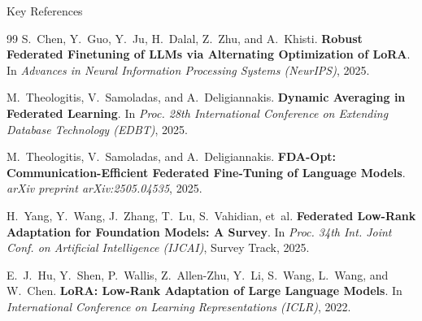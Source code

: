 \documentclass[aspectratio=169]{beamer}
\begin{document}
\begin{frame}{Key References}
    \scriptsize
    \begin{thebibliography}{99}
        S.~Chen, Y.~Guo, Y.~Ju, H.~Dalal, Z.~Zhu, and A.~Khisti.
        \newblock \textbf{Robust Federated Finetuning of LLMs via Alternating Optimization of LoRA}.
        \newblock In \emph{Advances in Neural Information Processing Systems (NeurIPS)}, 2025.
        
        M.~Theologitis, V.~Samoladas, and A.~Deligiannakis.
        \newblock \textbf{Dynamic Averaging in Federated Learning}.
        \newblock In \emph{Proc. 28th International Conference on Extending Database Technology (EDBT)}, 2025.
        
        M.~Theologitis, V.~Samoladas, and A.~Deligiannakis.
        \newblock \textbf{FDA-Opt: Communication-Efficient Federated Fine-Tuning of Language Models}.
        \newblock \emph{arXiv preprint arXiv:2505.04535}, 2025.
        
        H.~Yang, Y.~Wang, J.~Zhang, T.~Lu, S.~Vahidian, et~al.
        \newblock \textbf{Federated Low-Rank Adaptation for Foundation Models: A Survey}.
        \newblock In \emph{Proc. 34th Int. Joint Conf. on Artificial Intelligence (IJCAI)}, Survey Track, 2025.
        
        E.~J.~Hu, Y.~Shen, P.~Wallis, Z.~Allen-Zhu, Y.~Li, S.~Wang, L.~Wang, and W.~Chen.
        \newblock \textbf{LoRA: Low-Rank Adaptation of Large Language Models}.
        \newblock In \emph{International Conference on Learning Representations (ICLR)}, 2022.
    \end{thebibliography}
\end{frame}
\end{document}

